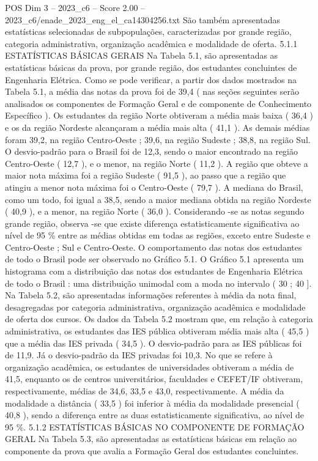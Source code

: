 \begin{textsample}{POS Dim 3 – 2023\_c6 – Score 2.00 – 2023\_c6/enade\_2023\_eng\_el\_ca14304256.txt}
São também apresentadas estatísticas selecionadas de subpopulações, caracterizadas por grande região, categoria administrativa, organização acadêmica e modalidade de oferta. 5.1.1 ESTATÍSTICAS BÁSICAS GERAIS Na Tabela 5.1, são apresentadas as estatísticas básicas da prova, por grande região, dos estudantes concluintes de Engenharia Elétrica.
Como se pode verificar, a partir dos dados mostrados na Tabela 5.1, a média das notas da prova foi de 39,4 ( nas seções seguintes serão analisados os componentes de Formação Geral e de componente de Conhecimento Específico ).
Os estudantes da região Norte obtiveram a média mais baixa ( 36,4 ) e os da região Nordeste alcançaram a média mais alta ( 41,1 ).
As demais médias foram 39,2, na região Centro-Oeste ; 39,6, na região Sudeste ; 38,8, na região Sul.
O desvio-padrão para o Brasil foi de 12,3, sendo o maior encontrado na região Centro-Oeste ( 12,7 ), e o menor, na região Norte ( 11,2 ).
A região que obteve a maior nota máxima foi a região Sudeste ( 91,5 ), ao passo que a região que atingiu a menor nota máxima foi o Centro-Oeste ( 79,7 ).
A mediana do Brasil, como um todo, foi igual a 38,5, sendo a maior mediana obtida na região Nordeste ( 40,9 ), e a menor, na região Norte ( 36,0 ).
Considerando -se as notas segundo grande região, observa -se que existe diferença estatisticamente significativa ao nível de 95 \% entre as médias obtidas em todas as regiões, exceto entre Sudeste e Centro-Oeste ; Sul e Centro-Oeste.
O comportamento das notas dos estudantes de todo o Brasil pode ser observado no Gráfico 5.1.
O Gráfico 5.1 apresenta um histograma com a distribuição das notas dos estudantes de Engenharia Elétrica de todo o Brasil : uma distribuição unimodal com a moda no intervalo ( 30 ; 40 ].
Na Tabela 5.2, são apresentadas informações referentes à média da nota final, desagregadas por categoria administrativa, organização acadêmica e modalidade de oferta dos cursos.
Os dados da Tabela 5.2 mostram que, em relação à categoria administrativa, os estudantes das IES pública obtiveram média mais alta ( 45,5 ) que a média das IES privada ( 34,5 ).
O desvio-padrão para as IES públicas foi de 11,9.
Já o desvio-padrão da IES privadas foi 10,3.
No que se refere à organização acadêmica, os estudantes de universidades obtiveram a média de 41,5, enquanto os de centros universitários, faculdades e CEFET/IF obtiveram, respectivamente, médias de 34,6, 33,5 e 43,0, respectivamente.
A média da modalidade a distância ( 33,5 ) foi inferior à média da modalidade presencial ( 40,8 ), sendo a diferença entre as duas estatisticamente significativa, ao nível de 95 \%. 5.1.2 ESTATÍSTICAS BÁSICAS NO COMPONENTE DE FORMAÇÃO GERAL Na Tabela 5.3, são apresentadas as estatísticas básicas em relação ao componente da prova que avalia a Formação Geral dos estudantes concluintes.

\end{textsample}
